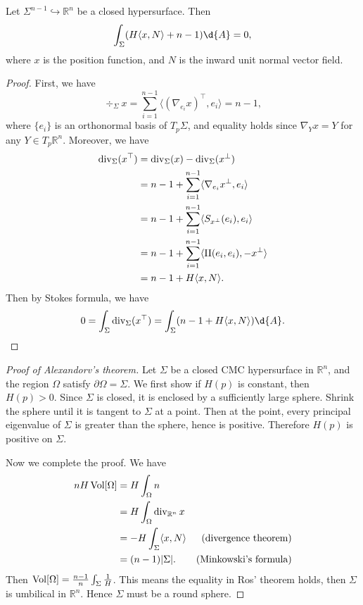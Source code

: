 \begin{thm}
    Let $\Sigma^{n-1}\hookrightarrow\mathbb{R}^n$ be a closed hypersurface. Then
    \[\int_\Sigma(H\langle x,N\rangle+n-1)\d{A}=0,\]
    where $x$ is the position function, and $N$ is the inward unit normal vector field.
\end{thm}
\begin{proof}
    First, we have
    \[\div\nolimits_\Sigma x=\sum_{i=1}^{n-1}\langle(\nabla_{e_i}x)^\top,e_i\rangle=n-1,\]
    where $\{e_i\}$ is an orthonormal basis of $T_p\Sigma$, and equality holds since $\nabla_{Y}x=Y$ for any $Y\in T_p\mathbb{R}^n$.
    Moreover, we have
    \begin{align*}
        \mathop{\mathrm{div}}\nolimits_\Sigma(x^\top)&=\mathop{\mathrm{div}}\nolimits_\Sigma(x)-\mathop{\mathrm{div}}\nolimits_\Sigma(x^\perp)\\
        &=n-1+\sum_{i=1}^{n-1}\langle\nabla_{e_i}x^\perp,e_i\rangle\\
        &=n-1+\sum_{i=1}^{n-1}\langle S_{x^\perp}(e_i),e_i\rangle\\
        &=n-1+\sum_{i=1}^{n-1}\langle\operatorname{II}(e_i,e_i),-x^\perp\rangle\\
        &=n-1+H\langle x,N\rangle.
    \end{align*}
    Then by Stokes formula, we have
    \[0=\int_\Sigma\div\nolimits_\Sigma(x^\top)=\int_\Sigma(n-1+H\langle x,N\rangle)\d{A}.\qedhere\]
\end{proof}

\begin{proof}[Proof of Alexandorv's theorem]
    Let $\Sigma$ be a closed CMC hypersurface in $\mathbb{R}^n$, and the region $\Omega$ satisfy $\partial\Omega=\Sigma$.
    We first show if $H(p)$ is constant, then $H(p)>0$.
    Since $\Sigma$ is closed, it is enclosed by a sufficiently large sphere.
    Shrink the sphere until it is tangent to $\Sigma$ at a point.
    Then at the point, every principal eigenvalue of $\Sigma$ is greater than the sphere, hence is positive.
    Therefore $H(p)$ is positive on $\Sigma$.

    Now we complete the proof.
    We have
    \begin{align*}
        nH\operatorname{Vol}[\Omega]&=H\int_\Omega n &\\
        &=H\int_\Omega\mathop{\mathrm{div}}\nolimits_{\mathbb{R}^n}x &\\
        &=-H\int_\Sigma\langle x,N\rangle & \text{(divergence theorem)}\\
        &=(n-1)|\Sigma|. & \text{(Minkowski's formula)}
    \end{align*}
    Then $\operatorname{Vol}[\Omega]=\frac{n-1}{n}\int_\Sigma\frac{1}{H}$.
    This means the equality in Ros' theorem holds, then $\Sigma$ is umbilical in $\mathbb{R}^n$.
    Hence $\Sigma$ must be a round sphere.
\end{proof}

